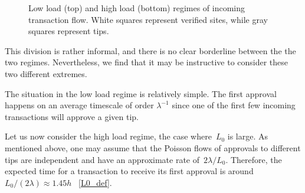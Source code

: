 \documentclass[12pt]{article}
\begin{document}
\begin{CJK}{UTF8}{bkai}
\begin{figure}
\caption{Low load (top) and high load (bottom) regimes of 
incoming transaction flow. White squares represent verified 
sites, while gray squares represent tips.
}
\label{f_regimes}
\end{figure}
This division is rather informal, and there is no
clear borderline between the the two regimes. Nevertheless,
we find that it may be instructive to consider these
two 
different 
extremes.

The situation in the low load regime is relatively simple. The first approval
 happens on an average timescale of order $\lambda^{-1}$
since 
one of the first few 
incoming transactions will approve 
a given tip.

Let us now consider the high load regime, 
the 
case where~$L_0$ is large.
As mentioned above, one may assume that
the Poisson flows of approvals to different tips are independent
and have an approximate rate of~$2\lambda/L_0$. Therefore,
 the expected time for a transaction to 
receive its first approval is around $L_0/(2\lambda)\approx 1.45 h$
~\eqref{L0_def}.


\end{CJK}
\end{document}
